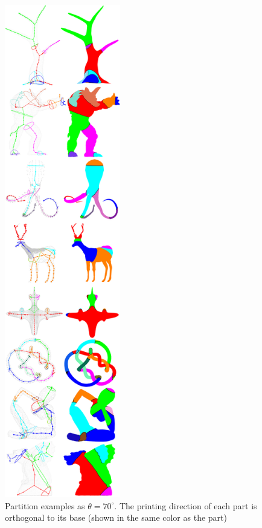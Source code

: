 \begin{figure}[t]
  \centering
  \includegraphics[width=0.45\textwidth]{figs/programming.png}
  \caption{\label{fig:programming}%
           Partition examples as $\theta = 70^{\circ}$. The printing direction of each part is orthogonal to its base (shown in the same color as the part)}
\end{figure}
